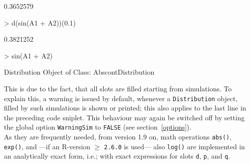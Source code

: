 \documentclass[11pt]{article}
\newcommand{\code}[1]{{\tt #1}}
\begin{document}
\begin{Schunk}
\begin{Soutput}
[1] 0.3652579
\end{Soutput}
\begin{Sinput}
>   d(sin(A1 + A2))(0.1)
\end{Sinput}
\begin{Soutput}
[1] 0.3821252
\end{Soutput}
\begin{Sinput}
>   sin(A1 + A2)
\end{Sinput}
\begin{Soutput}
Distribution Object of Class: AbscontDistribution
\end{Soutput}
\end{Schunk}
This is due to the fact, that all slots are filled starting from simulations.
To explain this, a warning is issued  by default, whenever a \code{Distribution}
object, filled by such simulations is shown or printed; this also applies to the
last line in the preceding code sniplet. This behaviour may again be switched
off by setting the global option
\code{WarningSim} to \code{FALSE} (see section~\ref{options}).\\

As they are frequently needed, from version 1.9 on, math operations
\code{abs()}, \code{exp()}, and ---if an {\sf R}-version $\ge$ {\tt 2.6.0} is
used--- also \code{log()} are implemented in an analytically exact form,
i.e.; with exact expressions for slots \code{d}, \code{p}, and \code{q}.

%

\end{document}
\end{Sinput}
\end{Schunk}
\end{document}
